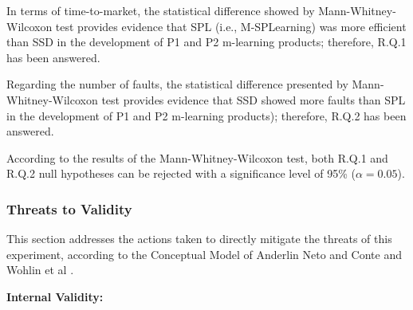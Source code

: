 In terms of time-to-market, the statistical difference showed by Mann-Whitney-Wilcoxon test provides evidence that SPL (i.e., M-SPLear\allowbreak ning) was more efficient than SSD in the development of P1 and P2 m-learning products; therefore, R.Q.1 has been answered.

Regarding the number of faults, the statistical difference presented by Mann-Whitney-Wilcoxon test provides evidence that SSD showed more faults than SPL in the development of P1 and P2 m-learning products); therefore, R.Q.2 has been answered.

According to the results of the Mann-Whitney-Wilcoxon test, both R.Q.1 and R.Q.2 null hypotheses can be rejected with a significance level of 95\% ($\alpha = 0.05$).

\subsubsection{Threats to Validity}\label{sec:threats}

This section addresses the actions taken to directly mitigate the threats of this experiment, according to the Conceptual Model of Anderlin Neto and Conte \cite{neto13} and Wohlin et al \cite{wohlin12}.

\vspace{1em}

\textbf{Internal Validity:}

